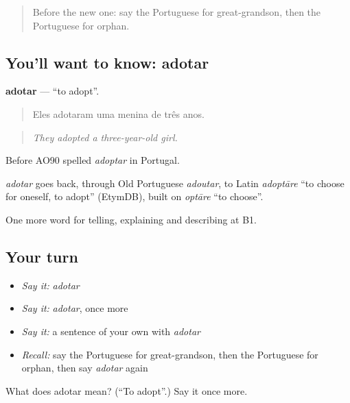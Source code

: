 \begin{quote}
Before the new one: say the Portuguese for great-grandson, then the Portuguese for orphan.
\end{quote}

\subsection*{You'll want to know: adotar}
\textbf{adotar} — \textquotedblleft{}to adopt\textquotedblright{}.

\begin{quote}
Eles adotaram uma menina de três anos.
\end{quote}

\begin{quote}
\emph{They adopted a three-year-old girl.}
\end{quote}

Before AO90 spelled \emph{adoptar} in Portugal.

\begin{cousinweb}
\emph{adotar} goes back, through Old Portuguese \emph{adoutar}, to Latin \emph{adoptāre} \textquotedblleft{}to choose for oneself, to adopt\textquotedblright{} (EtymDB), built on \emph{optāre} \textquotedblleft{}to choose\textquotedblright{}.
\end{cousinweb}

\begin{grammarlens}[title={What you've built}]
One more word for telling, explaining and describing at B1.
\end{grammarlens}

\subsection*{Your turn}
\begin{itemize}
\raggedright
  \item \emph{Say it:} \emph{adotar}
  \item \emph{Say it:} \emph{adotar}, once more
  \item \emph{Say it:} a sentence of your own with \emph{adotar}
  \item \emph{Recall:} say the Portuguese for great-grandson, then the Portuguese for orphan, then say \emph{adotar} again
\end{itemize}

\begin{tcolorbox}[breakable,colback=teal!4,colframe=teal!35!black,title={Before you move on}]
What does adotar mean? (\textquotedblleft{}To adopt\textquotedblright{}.) Say it once more.
\end{tcolorbox}
